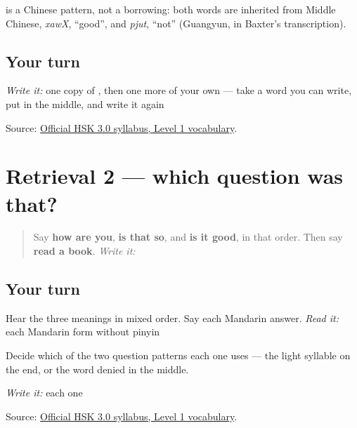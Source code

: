 \begin{cousinweb}
\textbf{} is a Chinese pattern, not a borrowing: both words are inherited from Middle Chinese, \emph{xawX}, \textquotedblleft{}good\textquotedblright{}, and \emph{pjut}, \textquotedblleft{}not\textquotedblright{} (Guangyun, in Baxter's transcription).
\end{cousinweb}

\subsection*{Your turn}
\emph{Write it:} one copy of \textbf{}, then one more of your own — take a word you can write, put  in the middle, and write it again

\begin{tcolorbox}[breakable,colback=teal!4,colframe=teal!35!black,title={Before you move on}]
Source: \href{https://hsk.cn-bj.ufileos.com/3.0/\%E6\%96\%B0\%E7\%89\%88HSK\%E8\%80\%83\%E8\%AF\%95\%E5\%A4\%A7\%E7\%BA\%B21219.pdf}{Official HSK 3.0 syllabus, Level 1 vocabulary}.
\end{tcolorbox}
\section[Practice]{Retrieval 2 — which question was that?}

\label{lesson:ZH-R19-ma-three-r2}



\begin{quote}
Say \textbf{how are you}, \textbf{is that so}, and \textbf{is it good}, in that order. Then say \textbf{read a book}. \emph{Write it:} \textbf{}
\end{quote}

\subsection*{Your turn}
Hear the three meanings in mixed order. Say each Mandarin answer. \emph{Read it:} each Mandarin form without pinyin

Decide which of the two question patterns each one uses — the light syllable on the end, or the word denied in the middle.

\emph{Write it:} each one

\begin{tcolorbox}[breakable,colback=teal!4,colframe=teal!35!black,title={Before you move on}]
Source: \href{https://hsk.cn-bj.ufileos.com/3.0/\%E6\%96\%B0\%E7\%89\%88HSK\%E8\%80\%83\%E8\%AF\%95\%E5\%A4\%A7\%E7\%BA\%B21219.pdf}{Official HSK 3.0 syllabus, Level 1 vocabulary}.
\end{tcolorbox}
